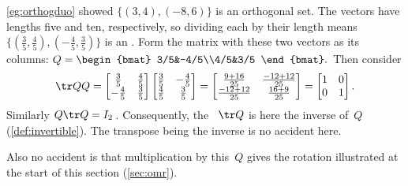\begin{example} 
\cref{eg:orthogduo} showed \(\{(3,4),(-8,6)\}\) is an orthogonal set.  
The vectors have lengths five and ten, respectively, so dividing each by their length means \(\{(\frac35,\frac45),(-\frac45,\frac35)\}\) is an .
Form the matrix with these two vectors as its columns:
\(Q%
=\begin{bmat} 3/5&-4/5\\4/5&3/5 \end{bmat}.
\)
Then consider
\begin{equation*}
\tr QQ=\begin{bmatrix} \frac35&\frac45\\-\frac45&\frac35 \end{bmatrix}
\begin{bmatrix} \frac35&-\frac45\\\frac45&\frac35 \end{bmatrix}
=\begin{bmatrix} \frac{9+16}{25}&\frac{-12+12}{25}\\
\frac{-12+12}{25}&\frac{16+9}{25} \end{bmatrix}
=\begin{bmatrix} 1&0\\0&1 \end{bmatrix}.
\end{equation*}
Similarly \(Q\tr Q=I_2\)\,.
Consequently, the ~\(\tr Q\) is here the inverse of~\(Q\) (\cref{def:invertible}).  
The transpose being the inverse is no accident here.

Also no accident is that multiplication by this~\(Q\) gives the rotation illustrated at the start of this section (\cref{sec:omr}).
\end{example}




\begin{comment}
Could change this definition to $Q$~is {invertible} and $Q^{-1}=\tr Q$.  Then prove equivalence.  Use this for now.
\end{comment}

